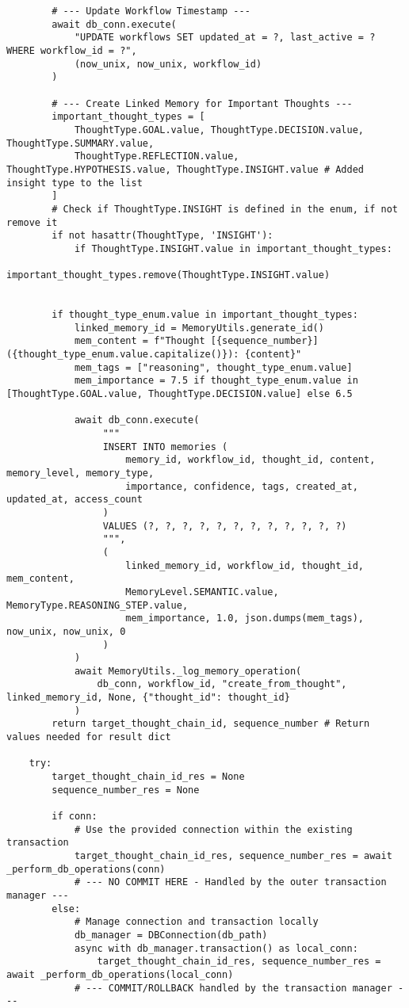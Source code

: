 \documentclass[12pt,a4paper]{article}
\begin{document}
\begin{pageablecode}
\begin{verbatim}
        # --- Update Workflow Timestamp ---
        await db_conn.execute(
            "UPDATE workflows SET updated_at = ?, last_active = ? WHERE workflow_id = ?",
            (now_unix, now_unix, workflow_id)
        )

        # --- Create Linked Memory for Important Thoughts ---
        important_thought_types = [
            ThoughtType.GOAL.value, ThoughtType.DECISION.value, ThoughtType.SUMMARY.value,
            ThoughtType.REFLECTION.value, ThoughtType.HYPOTHESIS.value, ThoughtType.INSIGHT.value # Added insight type to the list
        ]
        # Check if ThoughtType.INSIGHT is defined in the enum, if not remove it
        if not hasattr(ThoughtType, 'INSIGHT'):
            if ThoughtType.INSIGHT.value in important_thought_types:
                important_thought_types.remove(ThoughtType.INSIGHT.value)


        if thought_type_enum.value in important_thought_types:
            linked_memory_id = MemoryUtils.generate_id()
            mem_content = f"Thought [{sequence_number}] ({thought_type_enum.value.capitalize()}): {content}"
            mem_tags = ["reasoning", thought_type_enum.value]
            mem_importance = 7.5 if thought_type_enum.value in [ThoughtType.GOAL.value, ThoughtType.DECISION.value] else 6.5

            await db_conn.execute(
                 """
                 INSERT INTO memories (
                     memory_id, workflow_id, thought_id, content, memory_level, memory_type,
                     importance, confidence, tags, created_at, updated_at, access_count
                 )
                 VALUES (?, ?, ?, ?, ?, ?, ?, ?, ?, ?, ?, ?)
                 """,
                 (
                     linked_memory_id, workflow_id, thought_id, mem_content,
                     MemoryLevel.SEMANTIC.value, MemoryType.REASONING_STEP.value,
                     mem_importance, 1.0, json.dumps(mem_tags), now_unix, now_unix, 0
                 )
            )
            await MemoryUtils._log_memory_operation(
                db_conn, workflow_id, "create_from_thought", linked_memory_id, None, {"thought_id": thought_id}
            )
        return target_thought_chain_id, sequence_number # Return values needed for result dict

    try:
        target_thought_chain_id_res = None
        sequence_number_res = None

        if conn:
            # Use the provided connection within the existing transaction
            target_thought_chain_id_res, sequence_number_res = await _perform_db_operations(conn)
            # --- NO COMMIT HERE - Handled by the outer transaction manager ---
        else:
            # Manage connection and transaction locally
            db_manager = DBConnection(db_path)
            async with db_manager.transaction() as local_conn:
                target_thought_chain_id_res, sequence_number_res = await _perform_db_operations(local_conn)
            # --- COMMIT/ROLLBACK handled by the transaction manager ---


\end{verbatim}
\end{pageablecode}
\end{document}
